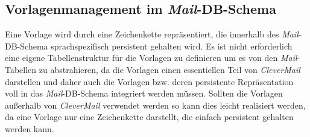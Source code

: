 \subsection{Vorlagenmanagement im \emph{Mail}-DB-Schema}
Eine Vorlage wird durch eine Zeichenkette repräsentiert, die innerhalb des \emph{Mail}-DB-Schema sprachspezifisch  persistent gehalten wird. Es ist nicht erforderlich eine eigene Tabellenstruktur für die Vorlagen zu definieren um es von den \emph{Mail}-Tabellen zu abstrahieren, da die Vorlagen einen essentiellen Teil von \emph{CleverMail} darstellen und daher auch die Vorlagen bzw. deren persistente Repräsentation voll in das \emph{Mail}-DB-Schema  integriert werden müssen. Sollten die Vorlagen außerhalb von \emph{CleverMail} verwendet werden so kann dies leicht realisiert werden, da eine Vorlage nur eine Zeichenkette darstellt, die einfach persistent gehalten werden kann.
